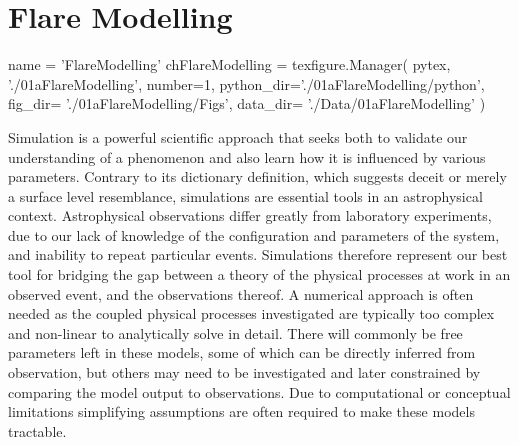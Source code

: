 \chapter{Flare Modelling}\label{Chap:FlareModelling}
\begin{pycode}[FlareModelling]
name = 'FlareModelling'
chFlareModelling = texfigure.Manager(
    pytex,
    './01aFlareModelling',
    number=1,
    python_dir='./01aFlareModelling/python',
    fig_dir=   './01aFlareModelling/Figs',
    data_dir=  './Data/01aFlareModelling'
)
\end{pycode}


Simulation is a powerful scientific approach that seeks both to validate our understanding of a phenomenon and also learn how it is influenced by various parameters.
Contrary to its dictionary definition, which suggests deceit or merely a surface level resemblance, simulations are essential tools in an astrophysical context.
Astrophysical observations differ greatly from laboratory experiments, due to our lack of knowledge of the configuration and parameters of the system, and inability to repeat particular events.
Simulations therefore represent our best tool for bridging the gap between a theory of the physical processes at work in an observed event, and the observations thereof.
A numerical approach is often needed as the coupled physical processes investigated are typically too complex and non-linear to analytically solve in detail.
There will commonly be free parameters left in these models, some of which can be directly inferred from observation, but others may need to be investigated and later constrained by comparing the model output to observations.
Due to computational or conceptual limitations simplifying assumptions are often required to make these models tractable.




